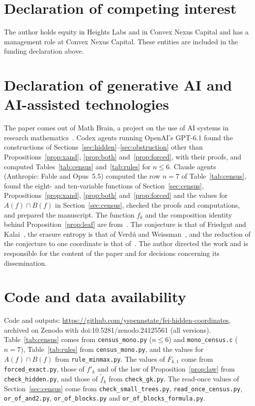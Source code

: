 \documentclass[11pt]{amsart}
\theoremstyle{remark}
\begin{document}
\section*{Declaration of competing interest}
The author holds equity in Heights Labs and in Convex Nexus Capital and has a management role at Convex Nexus Capital.
These entities are included in the funding declaration above.

\section*{Declaration of generative AI and AI-assisted technologies}
The paper comes out of Math Brain, a project on the use of AI systems in research
mathematics~\cite{BrainFramework,MathBrainRepo}. Codex agents running OpenAI's GPT-6.1 found the constructions of
Sections~\ref{sec:hidden}--\ref{sec:obstruction} other than Propositions~\ref{prop:xand}, \ref{prop:both}
and~\ref{prop:forced}, with their proofs, and computed Tables~\ref{tab:census} and~\ref{tab:rules} for $n\le6$. Claude
agents (Anthropic: Fable and Opus~5.5) computed the row $n=7$ of Table~\ref{tab:census}, found the eight- and
ten-variable functions of Section~\ref{sec:census}, Propositions~\ref{prop:xand}, \ref{prop:both}
and~\ref{prop:forced} and the values for $A(f)\cap B(f)$ in Section~\ref{sec:census}, checked the proofs and
computations, and prepared the manuscript. The function $f_k$ and the composition identity behind
Proposition~\ref{prop:leaf} are from~\cite{Shm3}. The conjecture is that of Friedgut and Kalai~\cite{FK96}, the
erasure entropy is that of Verd\'u and Weissman~\cite{VW08}, and the reduction of the conjecture to one coordinate is
that of~\cite{Shm1}. The author directed the work and is responsible for the
content of the paper and for decisions concerning its dissemination.

\section*{Code and data availability}
Code and outputs: \url{https://github.com/yspennstate/fei-hidden-coordinates}, archived on Zenodo with
doi:10.5281/zenodo.24125561 (all versions). Table~\ref{tab:census} comes from \texttt{census\_mono.py} ($n\le6$) and
\texttt{mono\_census.c} ($n=7$), Table~\ref{tab:rules} from \texttt{census\_mono.py}, and the values for $A(f)\cap B(f)$
from \texttt{rule\_minmax.py}. The values of $F_{k,1}$ come from \texttt{forced\_exact.py}, those of $f'_k$ and of the
law of Proposition~\ref{prop:law} from \texttt{check\_hidden.py}, and those of $\tilde f_k$ from \texttt{check\_gk.py}.
The read-once values of Section~\ref{sec:census} come from \texttt{check\_small\_trees.py},
\texttt{read\_once\_census.py}, \texttt{or\_of\_and2.py}, \texttt{or\_of\_blocks.py} and
\texttt{or\_of\_blocks\_formula.py}.
\end{document}
